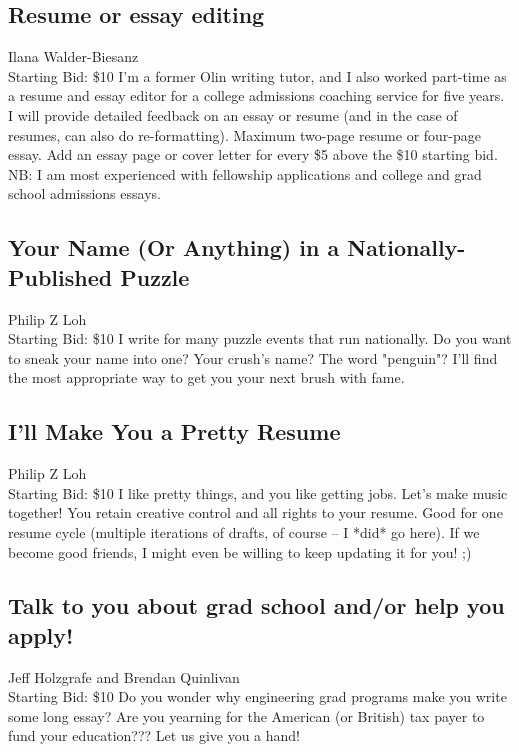 \documentclass[11pt]{article}
\begin{document}
\subsection{Resume or essay editing}
Ilana Walder-Biesanz
\\
Starting Bid: \$10
\newline
I'm a former Olin writing tutor, and I also worked part-time as a resume and essay editor for a college admissions coaching service for five years. I will provide detailed feedback on an essay or resume (and in the case of resumes, can also do re-formatting). Maximum two-page resume or four-page essay. Add an essay page or cover letter for every \$5 above the \$10 starting bid. NB: I am most experienced with fellowship applications and college and grad school admissions essays.
\subsection{Your Name (Or Anything) in a Nationally-Published Puzzle}
Philip Z Loh
\\
Starting Bid: \$10
\newline
I write for many puzzle events that run nationally. Do you want to sneak your name into one? Your crush's name? The word "penguin"? I'll find the most appropriate way to get you your next brush with fame.
\subsection{I'll Make You a Pretty Resume}
Philip Z Loh
\\
Starting Bid: \$10
\newline
I like pretty things, and you like getting jobs. Let's make music together! You retain creative control and all rights to your resume. Good for one resume cycle (multiple iterations of drafts, of course -- I *did* go here). If we become good friends, I might even be willing to keep updating it for you! ;)
\subsection{Talk to you about grad school and/or help you apply!}
Jeff Holzgrafe and Brendan Quinlivan
\\
Starting Bid: \$10
\newline
Do you wonder why engineering grad programs make you write some long essay? Are you yearning for the American (or British) tax payer to fund your education??? Let us give you a hand!
 
\end{document}
